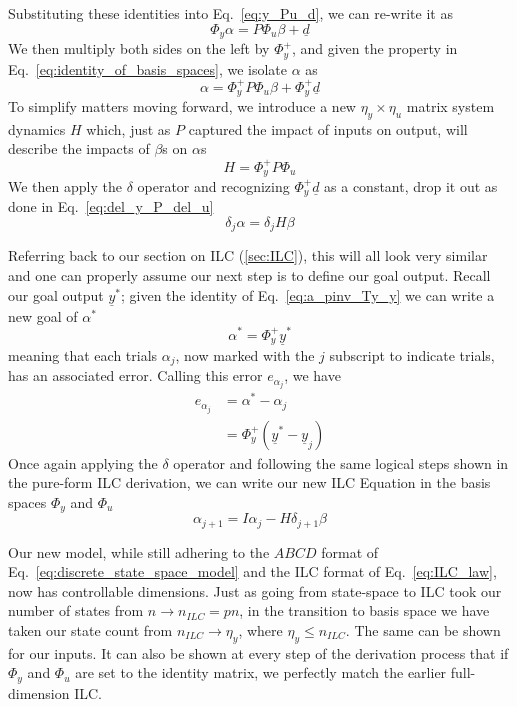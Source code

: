 Substituting these identities into Eq.~\ref{eq:y_Pu_d}, we can re-write it as
\begin{equation}
    \Phi_y \alpha = P\Phi_u \beta + \underline{d}
\end{equation}
We then multiply both sides on the left by $\Phi_y^+$, and given the property in Eq.~\ref{eq:identity_of_basis_spaces}, we isolate $\alpha$ as
\begin{equation}
    \alpha = \Phi_y^+ P\Phi_u \beta + \Phi_y^+ \underline{d}
\end{equation}
To simplify matters moving forward, we introduce a new $\eta_y \times \eta_u$ matrix system dynamics $H$ which, just as $P$ captured the impact of inputs on output, will describe the impacts of $\beta$s on $\alpha$s
\begin{equation}
    H = \Phi_y^+ P\Phi_u
    \label{eq:ilc_basis_H}
\end{equation}
We then apply the $\delta$ operator and recognizing $\Phi_y^+ \underline{d}$ as a constant, drop it out as done in Eq.~\ref{eq:del_y_P_del_u}
\begin{equation}
    \delta_j \alpha = \delta_j H \beta
\end{equation}

Referring back to our section on ILC (\ref{sec:ILC}), this will all look very similar and one can properly assume our next step is to define our goal output. Recall our goal output $\underline{y}^\ast$; given the identity of Eq.~\ref{eq:a_pinv_Ty_y} we can write a new goal of $\alpha^\ast$
\begin{equation}
    \alpha^\ast = \Phi_y^+ \underline{y}^\ast
\end{equation}
meaning that each trials $\alpha_j$, now marked with the $j$ subscript to indicate trials, has an associated error. Calling this error $e_{\alpha_j}$, we have
\begin{align}
    e_{\alpha_j} &= \alpha^\ast - \alpha_j \\
    &= \Phi_y^+ (\underline{y}^\ast - \underline{y}_j)  
\end{align}
Once again applying the $\delta$ operator and following the same logical steps shown in the pure-form ILC derivation, we can write our new ILC Equation in the basis spaces $\Phi_y$ and $\Phi_u$
\begin{equation}
    \alpha_{j+1} = I \alpha_{j} - H \delta_{j+1}\beta
\end{equation}

Our new model, while still adhering to the $ABCD$ format of Eq.~\ref{eq:discrete_state_space_model} and the ILC format of Eq.~\ref{eq:ILC_law}, now has controllable dimensions. Just as going from state-space to ILC took our number of states from $n \rightarrow n_{ILC} = pn$, in the transition to basis space we have taken our state count from $n_{ILC} \rightarrow \eta_y$, where $\eta_y \le n_{ILC}$. The same can be shown for our inputs. It can also be shown at every step of the derivation process that if $\Phi_y$ and $\Phi_u$ are set to the identity matrix, we perfectly match the earlier full-dimension ILC.%

